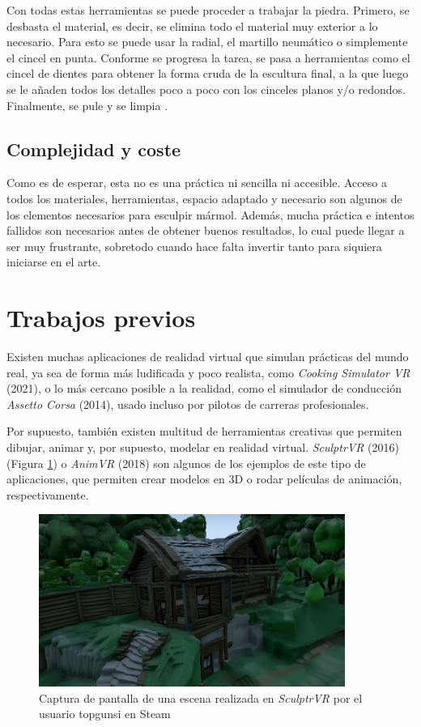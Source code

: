Con todas estas herramientas se puede proceder a trabajar la piedra. Primero, se desbasta el material, es decir, se elimina todo el material muy exterior a lo necesario. Para esto se puede usar la radial, el martillo neumático o simplemente el cincel en punta. Conforme se progresa la tarea, se pasa a herramientas como el cincel de dientes para obtener la forma cruda de la escultura final, a la que luego se le añaden todos los detalles poco a poco con los cinceles planos y/o redondos. Finalmente, se pule y se limpia \cite{marble_techniques}.

\subsection{Complejidad y coste}

Como es de esperar, esta no es una práctica ni sencilla ni accesible. Acceso a todos los materiales, herramientas, espacio adaptado y necesario son algunos de los elementos necesarios para esculpir mármol. Además, mucha práctica e intentos fallidos son necesarios antes de obtener buenos resultados, lo cual puede llegar a ser muy frustrante, sobretodo cuando hace falta invertir tanto para siquiera iniciarse en el arte.

\section{Trabajos previos}

Existen muchas aplicaciones de realidad virtual que simulan prácticas del mundo real, ya sea de forma más ludificada y poco realista, como \textit{Cooking Simulator VR} (2021), o lo más cercano posible a la realidad, como el simulador de conducción \textit{Assetto Corsa} (2014), usado incluso por pilotos de carreras profesionales.

Por supuesto, también existen multitud de herramientas creativas que permiten dibujar, animar y, por supuesto, modelar en realidad virtual. \textit{SculptrVR} (2016) (Figura \ref{fig:sculptrvr}) o \textit{AnimVR} (2018) son algunos de los ejemplos de este tipo de aplicaciones, que permiten crear modelos en 3D o rodar películas de animación, respectivamente.

\setcounter{footnote}{0}

\begin{figure}[H]
	\centering
	\includegraphics[width=10cm]{imagenes/sculptrvr}
	\caption[Captura de pantalla de una escena realizada en \textit{SculptrVR} por el usuario  topgunsi en Steam]{Captura de pantalla de una escena realizada en \textit{SculptrVR} por el usuario  topgunsi\protect\footnotemark[1]{} en Steam}
	\label{fig:sculptrvr}
\end{figure}


